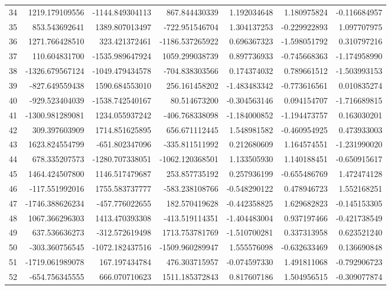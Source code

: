 \begin{longtable}{rrrrrrr}
34 & 1219.179109556 & -1144.849304113 & 867.844430339 & 1.192034648 & 1.180975824 & -0.116684957 \\
35 & 853.543692641 & 1389.807013497 & -722.951546704 & 1.304137253 & -0.229922893 & 1.097707975 \\
36 & 1271.766428510 & 323.421372461 & -1186.537265922 & 0.696367323 & -1.598051792 & 0.310797216 \\
37 & 110.604831700 & -1535.989647924 & 1059.299038739 & 0.897736933 & -0.745668363 & -1.174958990 \\
38 & -1326.679567124 & -1049.479434578 & -704.838303566 & 0.174374032 & 0.789661512 & -1.503993153 \\
39 & -827.649559438 & 1590.684553010 & 256.161458202 & -1.483483342 & -0.773616561 & 0.010835274 \\
40 & -929.523404039 & -1538.742540167 & 80.514673200 & -0.304563146 & 0.094154707 & -1.716689815 \\
41 & -1300.981289081 & 1234.055937242 & -406.768338098 & -1.184000852 & -1.194473757 & 0.163030201 \\
42 & 309.397603909 & 1714.851625895 & 656.671112445 & 1.548981582 & -0.460954925 & 0.473933003 \\
43 & 1623.824554799 & -651.802347096 & -335.811511992 & 0.212680609 & 1.164574551 & -1.231990020 \\
44 & 678.335207573 & -1280.707338051 & -1062.120368501 & 1.133505930 & 1.140188451 & -0.650915617 \\
45 & 1464.424507800 & 1146.517479687 & 253.857735192 & 0.257936199 & -0.655486769 & 1.472474128 \\
46 & -117.551992016 & 1755.583737777 & -583.238108766 & -0.548290122 & 0.478946723 & 1.552168251 \\
47 & -1746.388626234 & -457.776022655 & 182.570419628 & -0.442358825 & 1.629682823 & -0.145153305 \\
48 & 1067.366296303 & 1413.470393308 & -413.519114351 & -1.404483004 & 0.937197466 & -0.421738549 \\
49 & 637.536636273 & -312.572619498 & 1713.753781769 & -1.510700281 & 0.337313958 & 0.623521240 \\
50 & -303.360756545 & -1072.182437516 & -1509.960289947 & 1.555576098 & -0.632633469 & 0.136690848 \\
51 & -1719.061989078 & 167.197434784 & 476.303715957 & -0.074597330 & 1.491811068 & -0.792906723 \\
52 & -654.756345555 & 666.070710623 & 1511.185372843 & 0.817607186 & 1.504956515 & -0.309077874 \\

\end{longtable}
